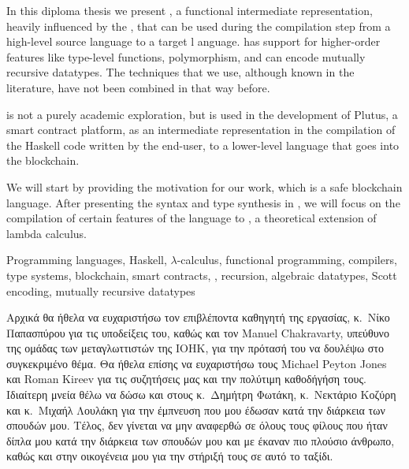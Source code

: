 \documentclass[diploma]{softlab-thesis}
\begin{document}

\begin{abstracten}%
In this diploma thesis we present \FIR{}, a functional intermediate representation, heavily influenced
by the \FOM{}, that can be used during the compilation step from a high-level source language to a target l
anguage. \FIR{} has support for higher-order features like type-level functions, polymorphism, and can encode
mutually recursive datatypes. The techniques that we use, although known in the literature, have
not been combined in that way before.

\FIR{} is not a purely academic exploration, but is used in the development of Plutus, a smart contract
platform, as an intermediate representation in the compilation of the Haskell code written by the end-user,
to a lower-level language that goes into the blockchain.

We will start by providing the motivation for our work, which is a safe blockchain language. After presenting the syntax and type synthesis in \FIR{}, we will focus on the compilation of certain features
of the language to \FOMF, a theoretical extension of lambda calculus.

\begin{keywordsen}
Programming languages, Haskell, $\lambda$-calculus, functional programming, compilers, type systems, blockchain, smart contracts, 
\FOM{}, recursion, algebraic datatypes, Scott encoding, mutually recursive datatypes
\end{keywordsen}
\end{abstracten}


\begin{acknowledgementsgr}
Αρχικά θα ήθελα να ευχαριστήσω τον επιβλέποντα καθηγητή της εργασίας, κ.\ Νίκο Παπασπύρου για τις υποδείξεις του, καθώς και τον Manuel Chakravarty, υπεύθυνο της ομάδας των μεταγλωττιστών της IOHK, για την πρότασή του να δουλέψω στο συγκεκριμένο θέμα. Θα ήθελα επίσης να ευχαριστήσω τους Michael Peyton Jones και Roman Kireev για τις συζητήσεις μας και την πολύτιμη καθοδήγήση τους. Ιδιαίτερη μνεία
θέλω να δώσω και στους κ.\ Δημήτρη Φωτάκη, κ.\ Νεκτάριο Κοζύρη και κ.\ Μιχαήλ Λουλάκη για την έμπνευση
που μου έδωσαν κατά την διάρκεια των σπουδών μου.
Τέλος, δεν γίνεται να μην αναφερθώ σε όλους τους φίλους που ήταν δίπλα μου κατά την διάρκεια των σπουδών μου και με έκαναν πιο πλούσιο άνθρωπο, καθώς και στην οικογένεια μου για την στήριξή τους σε αυτό το ταξίδι.
\end{acknowledgementsgr}
\end{document}
